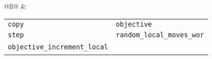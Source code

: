 \begin{adjustbox}{max width=\textwidth}
\begin{tabular}{@{}ll@{}}
    \midrule
               & \begin{tabular}{ll}
                                                          \texttt{copy}                        & \texttt{objective}                 \\
                                                          \texttt{step}                        & \texttt{random\_local\_moves\_wor} \\
                                                          \texttt{objective\_increment\_local} & \
                                                        \end{tabular} \\
    \bottomrule
  \end{tabular}
\end{adjustbox}